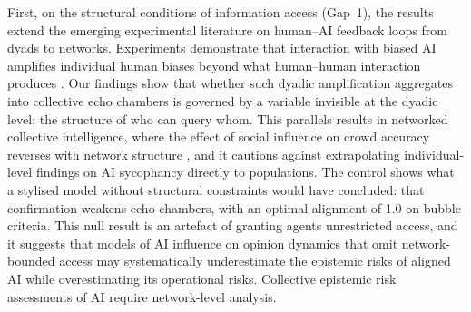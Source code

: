 \documentclass[pdflatex,sn-nature]{sn-jnl}
\begin{document}
First, on the structural conditions of information access (Gap~1), the results extend the emerging experimental literature on human--AI feedback loops from dyads to networks. Experiments demonstrate that interaction with biased AI amplifies individual human biases beyond what human--human interaction produces \citep{glickman2024human}. Our findings show that whether such dyadic amplification aggregates into collective echo chambers is governed by a variable invisible at the dyadic level: the structure of who can query whom. This parallels results in networked collective intelligence, where the effect of social influence on crowd accuracy reverses with network structure \citep{lorenz2011social,becker2017network}, and it cautions against extrapolating individual-level findings on AI sycophancy \citep{sharma2024generative} directly to populations. The control shows what a stylised model without structural constraints would have concluded: that confirmation weakens echo chambers, with an optimal alignment of 1.0 on bubble criteria. This null result is an artefact of granting agents unrestricted access, and it suggests that models of AI influence on opinion dynamics that omit network-bounded access may systematically underestimate the epistemic risks of aligned AI while overestimating its operational risks. Collective epistemic risk assessments of AI require network-level analysis.
\end{document}
